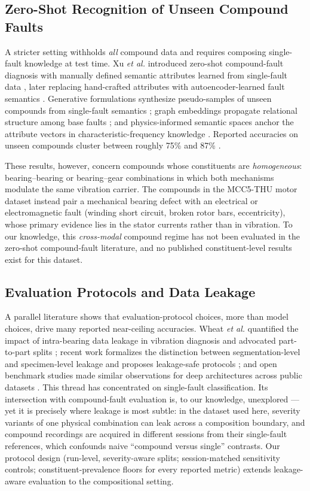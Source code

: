 \subsection{Zero-Shot Recognition of Unseen Compound Faults}

A stricter setting withholds \emph{all} compound data and requires composing
single-fault knowledge at test time. Xu \emph{et al.} introduced zero-shot
compound-fault diagnosis with manually defined semantic attributes learned from
single-fault data \cite{eswa2022}, later replacing hand-crafted attributes with
autoencoder-learned fault semantics \cite{eswa2023}. Generative formulations
synthesize pseudo-samples of unseen compounds from single-fault semantics
\cite{zsl2021,kbs2025}; graph embeddings propagate relational structure among
base faults \cite{neuro2025}; and physics-informed semantic spaces anchor the
attribute vectors in characteristic-frequency knowledge \cite{song2025gzsl}.
Reported accuracies on unseen compounds cluster between roughly 75\% and 87\%
\cite{eswa2022,eswa2023,song2025gzsl,appac2025}.

These results, however, concern compounds whose constituents are
\emph{homogeneous}: bearing--bearing or bearing--gear combinations in which
both mechanisms modulate the same vibration carrier. The compounds in the
MCC5-THU motor dataset instead pair a mechanical bearing defect with an
electrical or electromagnetic fault (winding short circuit, broken rotor bars,
eccentricity), whose primary evidence lies in the stator currents rather than
in vibration. To our knowledge, this \emph{cross-modal} compound regime has not
been evaluated in the zero-shot compound-fault literature, and no published
constituent-level results exist for this dataset.

\subsection{Evaluation Protocols and Data Leakage}

A parallel literature shows that evaluation-protocol choices, more than model
choices, drive many reported near-ceiling accuracies. Wheat \emph{et al.}
quantified the impact of intra-bearing data leakage in vibration diagnosis and
advocated part-to-part splits \cite{wheat2024}; recent work formalizes the
distinction between segmentation-level and specimen-level leakage and proposes
leakage-safe protocols \cite{gama2025,phme2025}; and open benchmark studies
made similar observations for deep architectures across public datasets
\cite{zhao2020benchmark}. This thread has concentrated on single-fault
classification. Its intersection with compound-fault evaluation is, to our
knowledge, unexplored --- yet it is precisely where leakage is most subtle: in
the dataset used here, severity variants of one physical combination can leak
across a composition boundary, and compound recordings are acquired in
different sessions from their single-fault references, which confounds naive
``compound versus single'' contrasts. Our protocol design (run-level,
severity-aware splits; session-matched sensitivity controls;
constituent-prevalence floors for every reported metric) extends leakage-aware
evaluation to the compositional setting.


